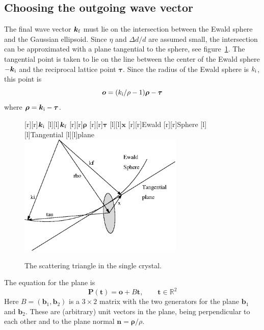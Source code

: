 \subsection{Choosing the outgoing wave vector}

The final wave vector $\boldsymbol{k}_{\rm f}$ must lie on the
intersection between the Ewald sphere and the Gaussian ellipsoid. Since
$\eta$ and $\Delta d/d$ are assumed small, the intersection can be
approximated with a plane tangential to the sphere, see
figure~\ref{fig:crystal-scattering-tri}. The tangential point is taken
to lie on the line between the center of the Ewald sphere
$-\boldsymbol{k}_{\rm i}$ and the reciprocal lattice point
$\boldsymbol{\tau}$. Since the radius of the Ewald sphere is $k_{\rm
  i}$, this point is
$$ \boldsymbol{o}=(k_{\rm i}/\rho - 1)\boldsymbol{\rho} - \boldsymbol{\tau} $$
where $\boldsymbol{\rho} = \boldsymbol{k}_{\rm i} - \boldsymbol{\tau}$.
\begin{figure}[t]
  \begin{center}
    [r][r]{$\boldsymbol{k}_{\rm i}$}
    [l][l]{$\boldsymbol{k}_{\rm f}$}
    [r][r]{$\boldsymbol{\rho}$}
    [r][r]{$\boldsymbol{\tau}$}
    [l][l]{$\boldsymbol{x}$}
    [r][r]{Ewald}
    [r][r]{Sphere}
    [l][l]{Tangential}
    [l][l]{plane}
    \includegraphics[width=0.7\textwidth]{figures/recip-detail.eps}
  \end{center}
\caption{The scattering triangle in the single crystal.}
\label{fig:crystal-scattering-tri}
\end{figure}

The equation for the plane is
\begin{equation}
  \label{eq:crystal-tangent-plane}
    \boldsymbol{P}(\boldsymbol{t}) = \boldsymbol{o} + B \boldsymbol{t}, \qquad
    \boldsymbol{t} \in \mathbb{R}^2
\end{equation}
Here $B = (\boldsymbol{b}_1, \boldsymbol{b}_2)$ is a $3\times 2$ matrix
with the two generators for the plane $\boldsymbol{b}_1$ and
$\boldsymbol{b}_2$. These are (arbitrary) unit vectors in the plane,
being perpendicular to
each other and to the plane normal $\boldsymbol{n} =
\boldsymbol{\rho}/\rho$.


